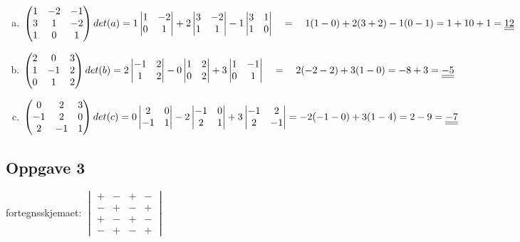 \documentclass{article}
\newcommand{\dett}[1]{\begin{vmatrix} #1 \end{vmatrix}}
\newcommand{\uu}[1]{\underline{\underline{#1}}}
\newcommand{\eqq}{\quad=\quad}
\begin{document}
\begin{enumerate}[a)]

\item \(
\begin{pmatrix}
1&-2&-1\\
3&1&-2\\
1&0&1
\end{pmatrix} 
\\\\\\
det(a) = 
1  \dett{1&-2\\0&1} +2 \dett{3&-2\\1&1} -1 \dett{3&1\\1&0} \eqq 1(1-0)+2(3+2)-1(0-1) = 1+10+1 = \uu{12}
\)

\vspace{1em}

\item \(
\begin{pmatrix}
2&0&3\\
1&-1&2\\
0&1&2
\end{pmatrix}
\\\\\\
det(b) =
2 \dett{-1&2\\1&2} -0 \dett{1&2\\0&2} +3 \dett{1&-1\\0&1} \eqq 2(-2-2) +3(1-0) = -8+3 = \uu{-5}
\)

\vspace{1em}
\item \(
\begin{pmatrix}
0&2&3\\
-1&2&0\\
2&-1&1
\end{pmatrix}
\\\\\\
det(c) = 
0\dett{2&0\\-1&1} -2\dett{-1&0\\2&1} +3\dett{-1&2\\2&-1} = -2(-1-0) +3(1-4) = 2-9 = \uu{-7}
\)

\end{enumerate}

\newpage
\subsection*{Oppgave 3}
fortegnsskjemaet: 
\(\begin{vmatrix}
    +&-&+&-\\-&+&-&+\\+&-&+&-\\-&+&-&+
\end{vmatrix}\) \\\\
\end{document}
